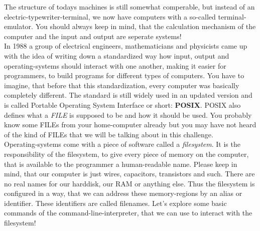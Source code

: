 \begin{challenge}
\begin{chadescription}
        The structure of todays machines is still somewhat comperable, but instead of an electric-typewriter-terminal, we now have computers with a so-called terminal-emulator. 
        You should always keep in mind, that the calculation mechanism of the computer and the input and output are seperate systems!\\
        In 1988 a group of electrical engineers, mathematicians and physicists came up with the idea of writing down a standardized way how input, output and operating-systems should interact with one another, making it easier for programmers, to build programs for different types of computers. 
        You have to imagine, that before that this standardization, every computer was basically completely different. 
        The standard is still widely used in an updated version and is called Portable Operating System Interface or short: \textbf{POSIX}.
        POSIX also defines what a \textit{FILE} is supposed to be and how it should be used. 
        You probably know some FILEs from your home-computer already but you may have not heard of the kind of FILEs that we will be talking about in this challenge.\\
        Operating-systems come with a piece of software called a \textit{filesystem}.
        It is the responsibility of the filesystem, to give every piece of memory on the computer, that is available to the programmer a human-readable name.
        Please keep in mind, that our computer is just wires, capacitors, transistors and such.
        There are no real names for our harddisk, our RAM or anything else. 
        Thus the filesystem is configured in a way, that we can address these memory-regions by an alias or identifier. 
        These identifiers are called filenames. 
        Let's explore some basic commands of the command-line-interpreter, that we can use to interact with the filesystem!
    \end{chadescription}


\end{challenge}
